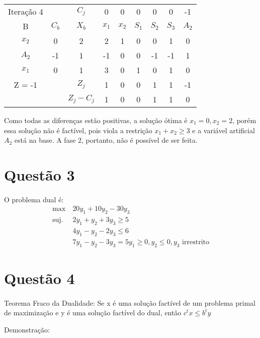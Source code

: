 \documentclass[11pt]{article}
\begin{document}
\begin{center}
\begin{tabular}{c c c c c c c c c}
Iteração 4 &  & \(C_j\) & 0 & 0 & 0 & 0 & 0 & -1\\
B & \(C_b\) & \(X_b\) & \(x_1\) & \(x_2\) & \(S_1\) & \(S_2\) & \(S_3\) & \(A_2\)\\
\(x_2\) & 0 & 2 & 2 & 1 & 0 & 0 & 1 & 0\\
\(A_2\) & -1 & 1 & -1 & 0 & 0 & -1 & -1 & 1\\
\(x_1\) & 0 & 1 & 3 & 0 & 1 & 0 & 1 & 0\\
Z = -1 &  & \(Z_j\) & 1 & 0 & 0 & 1 & 1 & -1\\
 &  & \(Z_j-C_j\) & 1 & 0 & 0 & 1 & 1 & 0\\
\end{tabular}
\end{center}

Como todas as diferenças estão positivas, a solução ótima é \(x_1=0, x_2=2\), porém essa solução não é factível, pois viola a restrição
\(x_1+x_2 \geq 3\) e a variável artificial \(A_2\) está na base. A fase 2, portanto, não é possível de ser feita.
\section{Questão 3}
\label{sec:org7d45a05}
\paragraph{} O problema dual é:
\begin{align*}
  \max \: &20y_{1} + 10y_{2} - 30y_{3} \\
  \text{suj. } &2y_{1} + y_{2} + 3y_{3} \geq 5\\
       &4y_{1} - y_{2} - 2y_{3} \leq 6 \\
  &7y_{1} - y_{2} - 3y_{3} = 5
    y_{1} \geq 0, y_{2} \leq 0, y_{3}\text{ irrestrito}
\end{align*}
\section{Questão 4}
\label{sec:orgaeb6648}
\paragraph{}Teorema Fraco da Dualidade: Se x é uma solução factível de um problema primal de
maximização e y é uma solução factível do dual, então
$c^{t}x \leq b^{t}y$

Demonstração:
\end{document}
